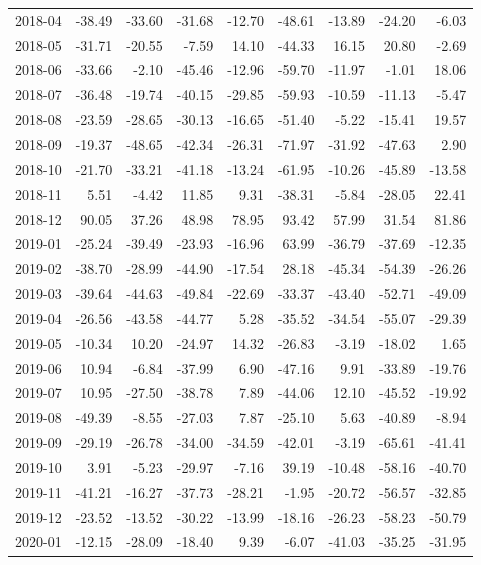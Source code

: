 \begin{table}[ht]
\begin{tabular}{lrrrrrrrr}
  2018-04 & -38.49 & -33.60 & -31.68 & -12.70 & -48.61 & -13.89 & -24.20 & -6.03 \\ 
  2018-05 & -31.71 & -20.55 & -7.59 & 14.10 & -44.33 & 16.15 & 20.80 & -2.69 \\ 
  2018-06 & -33.66 & -2.10 & -45.46 & -12.96 & -59.70 & -11.97 & -1.01 & 18.06 \\ 
  2018-07 & -36.48 & -19.74 & -40.15 & -29.85 & -59.93 & -10.59 & -11.13 & -5.47 \\ 
  2018-08 & -23.59 & -28.65 & -30.13 & -16.65 & -51.40 & -5.22 & -15.41 & 19.57 \\ 
  2018-09 & -19.37 & -48.65 & -42.34 & -26.31 & -71.97 & -31.92 & -47.63 & 2.90 \\ 
  2018-10 & -21.70 & -33.21 & -41.18 & -13.24 & -61.95 & -10.26 & -45.89 & -13.58 \\ 
  2018-11 & 5.51 & -4.42 & 11.85 & 9.31 & -38.31 & -5.84 & -28.05 & 22.41 \\ 
  2018-12 & 90.05 & 37.26 & 48.98 & 78.95 & 93.42 & 57.99 & 31.54 & 81.86 \\ 
  2019-01 & -25.24 & -39.49 & -23.93 & -16.96 & 63.99 & -36.79 & -37.69 & -12.35 \\ 
  2019-02 & -38.70 & -28.99 & -44.90 & -17.54 & 28.18 & -45.34 & -54.39 & -26.26 \\ 
  2019-03 & -39.64 & -44.63 & -49.84 & -22.69 & -33.37 & -43.40 & -52.71 & -49.09 \\ 
  2019-04 & -26.56 & -43.58 & -44.77 & 5.28 & -35.52 & -34.54 & -55.07 & -29.39 \\ 
  2019-05 & -10.34 & 10.20 & -24.97 & 14.32 & -26.83 & -3.19 & -18.02 & 1.65 \\ 
  2019-06 & 10.94 & -6.84 & -37.99 & 6.90 & -47.16 & 9.91 & -33.89 & -19.76 \\ 
  2019-07 & 10.95 & -27.50 & -38.78 & 7.89 & -44.06 & 12.10 & -45.52 & -19.92 \\ 
  2019-08 & -49.39 & -8.55 & -27.03 & 7.87 & -25.10 & 5.63 & -40.89 & -8.94 \\ 
  2019-09 & -29.19 & -26.78 & -34.00 & -34.59 & -42.01 & -3.19 & -65.61 & -41.41 \\ 
  2019-10 & 3.91 & -5.23 & -29.97 & -7.16 & 39.19 & -10.48 & -58.16 & -40.70 \\ 
  2019-11 & -41.21 & -16.27 & -37.73 & -28.21 & -1.95 & -20.72 & -56.57 & -32.85 \\ 
  2019-12 & -23.52 & -13.52 & -30.22 & -13.99 & -18.16 & -26.23 & -58.23 & -50.79 \\ 
  2020-01 & -12.15 & -28.09 & -18.40 & 9.39 & -6.07 & -41.03 & -35.25 & -31.95 \\ 

\end{tabular}
\end{table}
